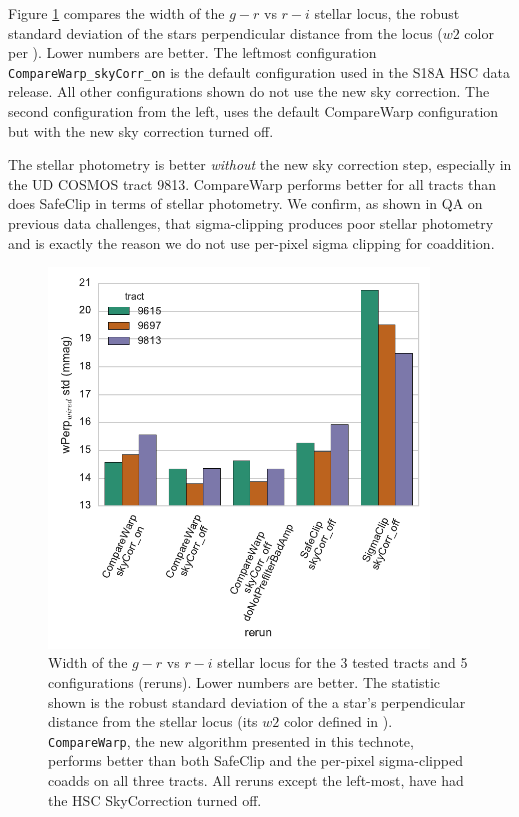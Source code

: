 \documentclass[DM,authoryear,toc]{lsstdoc}
\begin{document}
Figure \ref{fig:w_std_fit} compares the width of the $g-r$ vs $r-i$ stellar locus,  the robust standard deviation of the stars perpendicular distance from the locus ($w2$ color per \cite{Ivezic2004b}).
Lower numbers are better.
The leftmost configuration \texttt{CompareWarp\_skyCorr\_on} is the default configuration used in the S18A HSC data release.
All other configurations shown do not use the new sky correction.
The second configuration from the left, uses the default CompareWarp configuration but with the new sky correction turned off.

The stellar photometry is better \emph{without} the new sky correction step, especially in the UD COSMOS tract 9813.
CompareWarp performs better for all tracts than does SafeClip in terms of stellar photometry.
We confirm, as shown in QA on previous data challenges, that sigma-clipping produces poor stellar photometry and is exactly the reason we do not use per-pixel sigma clipping for coaddition.

\begin{figure}
\begin{centering}
\includegraphics[width=0.9\textwidth]{figures/w_std_fit.pdf}
\par\end{centering}
\caption{\label{fig:w_std_fit} Width of the $g-r$ vs $r-i$ stellar locus for the 3 tested tracts and 5 configurations (reruns). Lower numbers are better. The statistic shown is the robust standard deviation of the a star's perpendicular distance from the stellar locus (its $w2$ color defined in \cite{Ivezic2004b}). \texttt{CompareWarp}, the new algorithm presented in this technote, performs better than both SafeClip and the per-pixel sigma-clipped coadds on all three tracts. All reruns except the left-most, have had the HSC SkyCorrection turned off. }
\end{figure}
\end{document}
